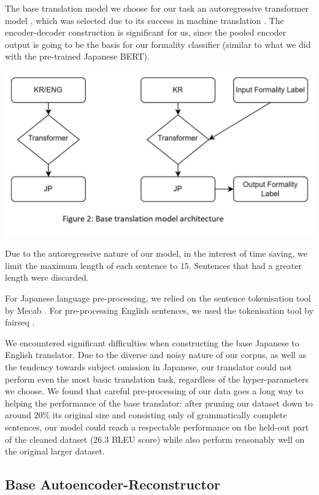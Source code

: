 \documentclass[11pt]{article}
\begin{document}
The base translation model we choose for our task an autoregressive transformer model \cite{vaswani2017attention}, which was selected due to its success in machine translation \cite{liu2020deep}. The encoder-decoder construction is significant for us, since the pooled encoder output is going to be the basis for our formality classifier (similar to what we did with the pre-trained Japanese BERT).

\includegraphics{images/baseline.jpg}

Due to the autoregressive nature of our model, in the interest of time saving, we limit the maximum length of each sentence to $15$. Sentences that had a greater length were discarded.

For Japanese language pre-processing, we relied on the sentence tokenisation tool by Mecab \cite{Kudo2005MeCabY}. For pre-processing English sentences, we used the tokenisation tool by fairseq \cite{ott2019fairseq}.

We encountered significant difficulties when constructing the base Japanese to English translator. Due to the diverse and noisy nature of our corpus, as well as the tendency towards subject omission in Japanese, our translator could not perform even the most basic translation task, regardless of the hyper-parameters we choose. We found that careful pre-processing of our data goes a long way to helping the performance of the base translator: after pruning our dataset down to around $20\%$ its original size and consisting only of grammatically complete sentences, our model could reach a respectable performance on the held-out part of the cleaned dataset ($26.3$ BLEU score) while also perform reasonably well on the original larger dataset.

\subsection{Base Autoencoder-Reconstructor}
\end{document}
